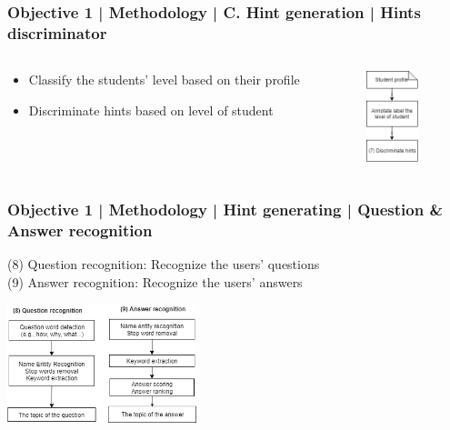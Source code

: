 \documentclass{beamer}
\begin{document}
\begin{frame}
\frametitle{Objective 1 | Methodology | C. Hint generation | Hints discriminator }
\begin{columns}
	
	\begin{column}{.55\textwidth}
		\begin{itemize}
			\item Classify the students' level based on their profile
			\item Discriminate hints based on level of student
			
		\end{itemize}
		
	\end{column}
	\begin{column}{.35\textwidth}
		\includegraphics[width=15mm]{hd1.png}
	\end{column}
\end{columns}
\end{frame}
\begin{frame}
\frametitle{Objective 1 | Methodology | Hint generating | Question \& Answer recognition }
(8) Question recognition: Recognize the users' questions\\
(9) Answer recognition: Recognize the users' answers
\begin{center}
		\includegraphics[width=55mm]{qa3.png}
\end{center}
\end{frame}
	
\end{document}
